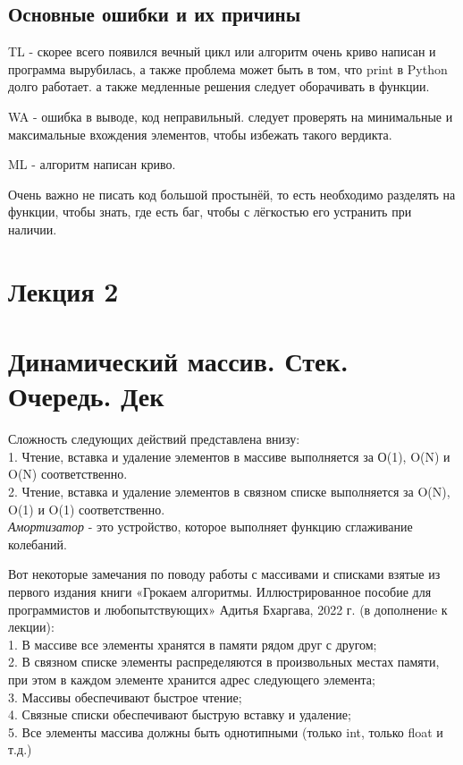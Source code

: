 \documentclass[12pt]{article}
\begin{document}
\subsection*{Основные ошибки и их причины}
TL - скорее всего появился вечный цикл или алгоритм очень криво написан и программа вырубилась, а также проблема может быть в том, что print в Python долго работает. а также медленные решения следует оборачивать в функции.

WA - ошибка в выводе, код неправильный. следует проверять на минимальные и максимальные вхождения элементов, чтобы избежать такого вердикта.

ML - алгоритм написан криво.

Очень важно не писать код большой простынёй, то есть необходимо разделять на функции, чтобы знать, где есть баг, чтобы с лёгкостью его устранить при наличии.

\newpage
\section*{Лекция 2}
\section*{Динамический массив. Стек. Очередь. Дек}
Сложность следующих действий представлена внизу:\\
1. Чтение, вставка и удаление элементов в массиве выполняется за О(1), O(N) и O(N) соответственно.\\
2. Чтение, вставка и удаление элементов в связном списке выполняется за O(N), O(1) и O(1) соответственно.\\
\textit{Амортизатор} - это устройство, которое выполняет функцию сглаживание колебаний.

Вот некоторые замечания по поводу работы с массивами и списками взятые из первого издания книги «Грокаем алгоритмы. Иллюстрированное пособие для программистов и любопытствующих» Адитья Бхаргава, 2022 г. (в дополнениe к лекции):\\
1. В массиве все элементы хранятся в памяти рядом друг с другом;\\
2. В связном списке элементы распределяются в произвольных местах памяти, при этом в каждом элементе хранится адрес следующего элемента;\\
3. Массивы обеспечивают быстрое чтение;\\
4. Связные списки обеспечивают быструю вставку и удаление;\\
5. Все элементы массива должны быть однотипными (только int, только float и т.д.)
\end{document}
